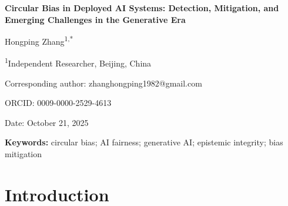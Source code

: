 \documentclass[11pt]{article}
\begin{document}
\begin{center}
{\LARGE\bfseries Circular Bias in Deployed AI Systems: Detection, Mitigation, and Emerging Challenges in the Generative Era}

\vspace{1cm}

{\large Hongping Zhang\textsuperscript{1,*}}

\vspace{0.5cm}

{\small \textsuperscript{1}Independent Researcher, Beijing, China}

{\small *Corresponding author: zhanghongping1982@gmail.com}

{\small ORCID: 0009-0000-2529-4613}

\vspace{0.5cm}

{\small Date: October 21, 2025}
\end{center}

\vspace{1cm}

\begin{abstract}
Circular bias—self-reinforcing feedback loops through which artificial intelligence (AI) systems reshape their training data—threatens algorithmic fairness and epistemic integrity. Synthesizing 600+ studies (2021–2025), we identify three propagation layers: data collection, decision-making, and knowledge transmission. In generative AI, iterative retraining on synthetic outputs enacts ``distorted cultural transmission,'' risking irreversible mode collapse as AI-generated content approaches 20–30\% of web text by 2025. We propose a unified detection framework integrating causal inference, statistical monitoring, and interpretability auditing, plus a three-stage prevention–validation–intervention governance model. Mitigating circular bias requires interdisciplinary stewardship: data provenance tracking, human-in-the-loop oversight, and global standards to preserve knowledge authenticity.
\end{abstract}

\noindent\textbf{Keywords:} circular bias; AI fairness; generative AI; epistemic integrity; bias mitigation

\newpage

\section{Introduction}
\end{document}
